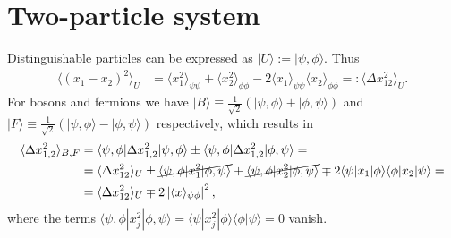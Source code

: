 \documentclass[english, parskip=full]{scrartcl}
\newcommand{\bra}{}
\newcommand{\brak}{}
\newcommand{\braket}{}
\newcommand{\kla}{}
\newcommand{\Ket}{}
\begin{document}
\section{Two-particle system}
Distinguishable particles can be expressed as $\Ket | {U} \rangle :=\Ket | {\psi,\phi} \rangle$. 
Thus
\begin{align*}
\bra\langle {(x_1-x_2)^2}\rangle_U&=\bra\langle {x_1^2}\rangle_{\psi\psi}+\bra\langle {x_2^2}\rangle_{\phi\phi}-2\bra\langle {x_1}\rangle_{\psi\psi}\bra\langle {x_2}\rangle_{\phi\phi}=:\bra\langle {\Delta x_{12}^2}\rangle_U.
\end{align*}
For bosons and fermions we have $\Ket | {B} \rangle\equiv\frac{1}{\sqrt{2}}\kla\left( {\Ket | {\psi,\phi} \rangle+\Ket | {\phi,\psi} \rangle} \right)$ and $\Ket | {F} \rangle\equiv\frac{1}{\sqrt{2}}\kla\left( {\Ket | {\psi,\phi} \rangle-\Ket | {\phi,\psi} \rangle} \right)$ respectively, which results in
\begin{align*}
\bra\langle {\Delta x_{1,2}^2}\rangle_{B,F}&=\braket\langle {\psi,\phi} | {\Delta x_{1,2}^2} | {\psi,\phi}\rangle\pm\braket\langle {\psi,\phi} | {\Delta x_{1,2}^2} | {\phi,\psi}\rangle=\\
&=\bra\langle {\Delta x_{12}^2}\rangle_U\pm \cancel{\braket\langle {\psi,\phi} | {x_1^2} | {\phi,\psi}\rangle}+\cancel{\braket\langle {\psi,\phi} | {x_2^2} | {\phi,\psi}\rangle}\mp 2\braket\langle {\psi} | {x_1} | {\phi}\rangle\braket\langle {\phi} | {x_2} | {\psi}\rangle=\\
&=\bra\langle {\Delta x_{12}^2}\rangle_U\mp 2\left\vert\bra\langle {x}\rangle_{\psi\phi}\right\vert^2,
\end{align*}
where the terms $\braket\langle {\psi,\phi} | {x_j^2} | {\phi,\psi}\rangle=\braket\langle {\psi} | {x_j^2} | {\phi}\rangle\brak\langle {\phi}| {\psi}\rangle=0$ vanish.
\end{document}
